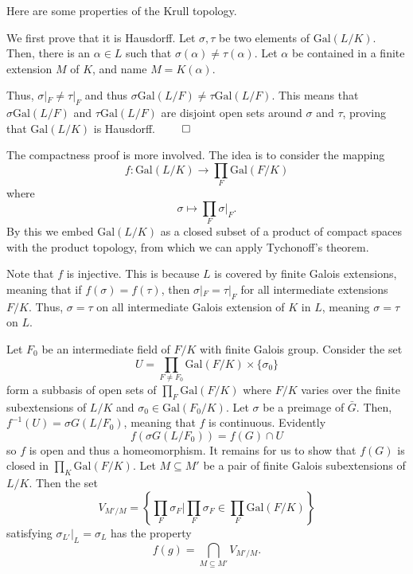 \documentclass[a4paper, 12pt,oneside,openany]{book}
\begin{document}

Here are some properties of the Krull topology.


 We first prove that it is Hausdorff. Let $\sigma, \tau$ be two elements of $\text{Gal}(L/K)$. Then, there is an $\alpha \in L$ such that $\sigma(\alpha) \neq \tau(\alpha)$. Let $\alpha$ be contained in a finite extension $M$ of $K$, and name $M=K(\alpha)$. 

Thus, $\sigma|_F \neq \tau|_F$ and thus $\sigma \text{Gal}(L/F) \neq \tau \text{Gal}(L/F)$. This means that $\sigma \text{Gal}(L/F)$ and $\tau \text{Gal}(L/F)$ are disjoint open sets around $\sigma$ and $\tau$, proving that $\text{Gal}(L/K)$ is Hausdorff. $\qed$

The compactness proof is more involved. The idea is to consider the mapping $$f:\text{Gal}(L/K) \to \prod\limits_F \text{Gal}(F/K)$$ where $$\sigma \mapsto \prod_F \sigma |_F.$$ By this we embed $\text{Gal}(L/K)$ as a closed subset of a product of compact spaces with the product topology, from which we can apply Tychonoff's theorem.  

Note that $f$ is injective. This is because $L$ is covered by finite Galois extensions, meaning that if $f(\sigma)=f(\tau)$, then $\sigma |_F = \tau |_F$ for all intermediate extensions $F/K$. Thus, $\sigma = \tau$ on all intermediate Galois extension of $K$ in $L$, meaning $\sigma=\tau$ on $L$.

Let $F_0$ be an intermediate field of $F/K$ with finite Galois group. Consider the set $$U= \prod\limits_{F\neq F_0} \text{Gal}(F/K) \times \{\sigma_0\}$$ form a subbasis of open sets of $\prod\limits_F \text{Gal}(F/K)$ where $F/K$ varies over the finite subextensions of $L/K$ and $\sigma_0 \in \text{Gal}(F_0/K)$. Let $\sigma$ be a preimage of $\bar{G}$. Then, $f^{-1}(U) = \sigma G(L/F_0)$, meaning that $f$ is continuous. Evidently $$f(\sigma G(L/F_0)) = f(G) \cap U$$ so $f$ is open and thus a homeomorphism. It remains for us to show that $f(G)$ is closed in $\prod\limits_K \text{Gal}(F/K)$. Let $M \subseteq M'$ be a pair of finite Galois subextensions of $L/K$.  Then the set $$V_{M'/M} = \left\{\prod\limits_F \sigma_F | \prod\limits_F \sigma_F \in \prod\limits_F \text{Gal}(F/K)\right\}$$ satisfying $\sigma_{L'} |_L = \sigma_L$ has the property $$f(g) = \bigcap\limits_{M \subseteq M'} V_{M'/M}.$$
\end{document}
